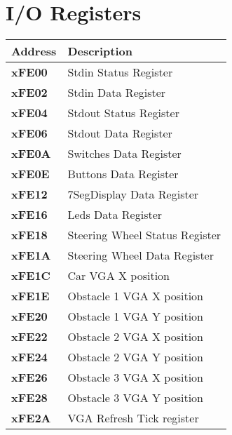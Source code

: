 \section{I/O Registers}
\begin{tabular}{| l | l |}
\hline
\textbf{Address}		& \textbf{Description}\\
\hline

\textbf{xFE00}			& Stdin Status Register\\
\textbf{xFE02}			& Stdin Data Register\\
\hline

\textbf{xFE04}			& Stdout Status Register\\
\textbf{xFE06}			& Stdout Data Register\\
\hline

\textbf{xFE0A}			& Switches Data Register\\
\textbf{xFE0E}			& Buttons Data Register\\
\textbf{xFE12}			& 7SegDisplay Data Register\\
\textbf{xFE16}			& Leds Data Register\\
\hline

\textbf{xFE18}			& Steering Wheel Status Register\\
\textbf{xFE1A}			& Steering Wheel Data Register\\
\hline

\textbf{xFE1C}			& Car VGA X position\\
\hline

\textbf{xFE1E}			& Obstacle 1 VGA X position\\
\textbf{xFE20}			& Obstacle 1 VGA Y position\\
\textbf{xFE22}			& Obstacle 2 VGA X position\\
\textbf{xFE24}			& Obstacle 2 VGA Y position\\
\textbf{xFE26}			& Obstacle 3 VGA X position\\
\textbf{xFE28}			& Obstacle 3 VGA Y position\\
\hline

\textbf{xFE2A}			& VGA Refresh Tick register\\
\hline

\hline
\end{tabular}